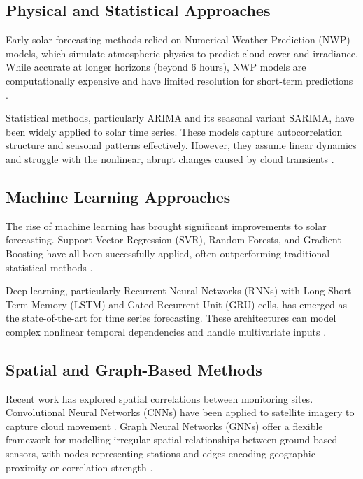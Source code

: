 \documentclass[11pt,a4paper]{article}
\begin{document}
\subsection{Physical and Statistical Approaches}

Early solar forecasting methods relied on Numerical Weather Prediction (NWP) models, which simulate atmospheric physics to predict cloud cover and irradiance. While accurate at longer horizons (beyond 6 hours), NWP models are computationally expensive and have limited resolution for short-term predictions \citep{Diagne2013}.

Statistical methods, particularly ARIMA and its seasonal variant SARIMA, have been widely applied to solar time series. These models capture autocorrelation structure and seasonal patterns effectively. However, they assume linear dynamics and struggle with the nonlinear, abrupt changes caused by cloud transients \citep{Reikard2009}.

\subsection{Machine Learning Approaches}

The rise of machine learning has brought significant improvements to solar forecasting. Support Vector Regression (SVR), Random Forests, and Gradient Boosting have all been successfully applied, often outperforming traditional statistical methods \citep{Voyant2017}.

Deep learning, particularly Recurrent Neural Networks (RNNs) with Long Short-Term Memory (LSTM) and Gated Recurrent Unit (GRU) cells, has emerged as the state-of-the-art for time series forecasting. These architectures can model complex nonlinear temporal dependencies and handle multivariate inputs \citep{Qing2018}.

\subsection{Spatial and Graph-Based Methods}

Recent work has explored spatial correlations between monitoring sites. Convolutional Neural Networks (CNNs) have been applied to satellite imagery to capture cloud movement \citep{Paletta2021}. Graph Neural Networks (GNNs) offer a flexible framework for modelling irregular spatial relationships between ground-based sensors, with nodes representing stations and edges encoding geographic proximity or correlation strength \citep{Wu2020}.
\end{document}
